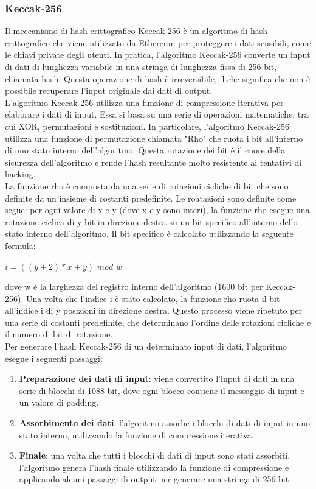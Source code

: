 \documentclass[a4paper,11pt]{report}
\begin{document}
\subsubsection{Keccak-256}
Il meccanismo di hash crittografico Keccak-256 è un algoritmo di hash crittografico che viene utilizzato da Ethereum per proteggere i dati sensibili, come le chiavi private degli utenti. In pratica, l'algoritmo Keccak-256 converte un input di dati di lunghezza variabile in una stringa di lunghezza fissa di 256 bit, chiamata hash. Questa operazione di hash è irreversibile, il che significa che non è possibile recuperare l'input originale dai dati di output.\\
L'algoritmo Keccak-256 utilizza una funzione di compressione iterativa per elaborare i dati di input. Essa si basa su una serie di operazioni matematiche, tra cui XOR, permutazioni e sostituzioni. In particolare, l'algoritmo Keccak-256 utilizza una funzione di permutazione chiamata "Rho" che ruota i bit all'interno di uno stato interno dell'algoritmo. Questa rotazione dei bit è il cuore della sicurezza dell'algoritmo e rende l'hash resultante molto resistente ai tentativi di hacking.\\
La funzione rho è composta da una serie di rotazioni cicliche di bit che sono definite da un insieme di costanti predefinite. Le roatazioni sono definite come segue: per ogni valore di x e y (dove x e y sono interi), la funzione rho esegue una rotazione ciclica di y bit in direzione destra su un bit specifico all'interno dello stato interno dell'algoritmo. Il bit specifico è calcolato utilizzando la seguente formula:
\begin{center}
    $i = ((y + 2) * x + y)$ $mod$ $w$
\end{center}
dove w è la larghezza del registro interno dell'algoritmo (1600 bit per Keccak-256).
Una volta che l'indice i è stato calcolato, la funzione rho ruota il bit all'indice i di y posizioni in direzione destra. Questo processo viene ripetuto per una serie di costanti predefinite, che determinano l'ordine delle rotazioni cicliche e il numero di bit di rotazione.\\
Per generare l'hash Keccak-256 di un determinato input di dati, l'algoritmo esegue i seguenti passaggi:
\begin{enumerate}
    \item \textbf{Preparazione dei dati di input}: viene convertito l'input di dati in una serie di blocchi di 1088 bit, dove ogni blocco contiene il messaggio di input e un valore di padding.
    \item \textbf{Assorbimento dei dati}: l'algoritmo assorbe i blocchi di dati di input in uno stato interno, utilizzando la funzione di compressione iterativa.
    \item \textbf{Finale}: una volta che tutti i blocchi di dati di input sono stati assorbiti, l'algoritmo genera l'hash finale utilizzando la funzione di compressione e applicando alcuni passaggi di output per generare una stringa di 256 bit.
\end{enumerate}
\end{document}
